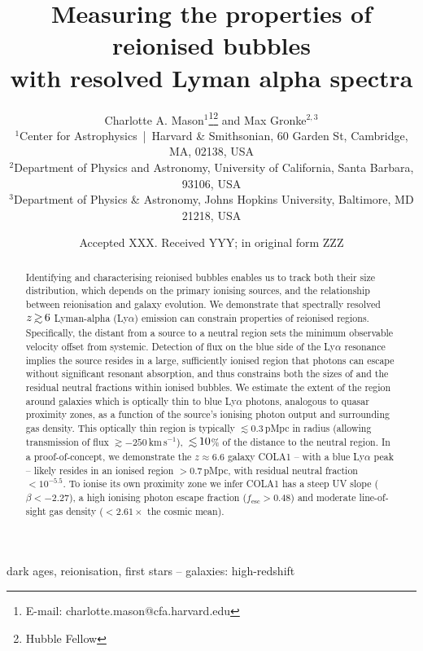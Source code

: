 \documentclass[fleqn,usenatbib]{mnras}
\title[Properties of reionised bubbles]{Measuring the properties of reionised bubbles\\with resolved Lyman alpha spectra}
\author[Mason and Gronke]{Charlotte A. Mason$^{1}$\thanks{E-mail: charlotte.mason@cfa.harvard.edu}\thanks{Hubble Fellow}
and Max Gronke$^{2,3}$\href{Hfootnote.2}{\samethanks}
\\
$^{1}$Center for Astrophysics \,|\, Harvard \& Smithsonian, 60 Garden St, Cambridge, MA, 02138, USA\\
$^{2}$Department of Physics and Astronomy, University of California, Santa Barbara, 93106, USA\\
$^{3}$Department of Physics \& Astronomy, Johns Hopkins University, Baltimore, MD 21218, USA
}
\date{Accepted XXX. Received YYY; in original form ZZZ}
\begin{document}
\label{firstpage}
\pagerange{\pageref{firstpage}--\pageref{lastpage}}
\maketitle

\begin{abstract}
%
Identifying and characterising reionised bubbles enables us to track both their size distribution, which depends on the primary ionising sources, and the relationship between reionisation and galaxy evolution.
%
We demonstrate that spectrally resolved $z\simgt6$ Lyman-alpha (Ly$\alpha$) emission can constrain properties of reionised regions.
%
Specifically, the distant from a source to a neutral region sets the minimum observable \lya velocity offset from systemic. Detection of flux on the blue side of the Ly$\alpha$ resonance implies the source resides in a large, sufficiently ionised region that photons can escape without significant resonant absorption, and thus constrains both the sizes of and the residual neutral fractions within ionised bubbles. 
%
We estimate the extent of the region around galaxies which is optically thin to blue Ly$\alpha$ photons, analogous to quasar proximity zones, as a function of the source's ionising photon output and surrounding gas density.
This optically thin region is typically $\lesssim 0.3$\,pMpc in radius (allowing transmission of flux $\gtrsim -250$\,km\,s$^{-1}$), $\simlt 10$\% of the distance to the neutral region.
%
In a proof-of-concept, we demonstrate the $z\approx6.6$ galaxy COLA1 -- with a blue Ly$\alpha$ peak -- likely resides in an ionised region $>0.7$\,pMpc, with residual neutral fraction $<10^{-5.5}$. To ionise its own proximity zone we infer COLA1 has a steep UV slope ($\beta < -2.27$), a high ionising photon escape fraction ($f_{\mathrm{esc}}>0.48$) and moderate line-of-sight gas density ($<2.61\times$ the cosmic mean).
%
\end{abstract}

\begin{keywords}
dark ages, reionisation, first stars -- galaxies: high-redshift
\end{keywords}
\end{document}
